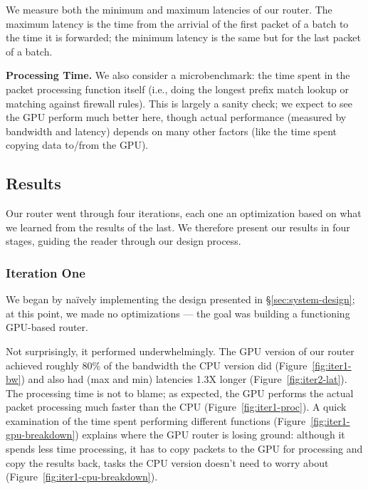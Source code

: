 We measure both the minimum and maximum latencies of our router. The maximum
latency is the time from the arrivial of the first packet of a batch to the
time it is forwarded; the minimum latency is the same but for the last packet
of a batch.

\medskip \noindent \textbf{Processing Time.} We also consider a microbenchmark:
the time spent in the packet processing function itself (i.e., doing the longest
prefix match lookup or matching against firewall rules). This is largely a
sanity check; we expect to see the GPU perform much better here, though actual
performance (measured by bandwidth and latency) depends on many other factors
(like the time spent copying data to/from the GPU).


\subsection{Results}
\label{sec:results}

Our router went through four iterations, each one an optimization based on what
we learned from the results of the last. We therefore present our results in
four stages, guiding the reader through our design process.

\subsubsection{Iteration One}

We began by na\"{i}vely implementing the design presented in
\S\ref{sec:system-design}; at this point, we made no optimizations --- the goal
was building a functioning GPU-based router.

Not surprisingly, it performed underwhelmingly. The GPU version of our router
achieved roughly 80\% of the bandwidth the CPU version did
(Figure~\ref{fig:iter1-bw}) and also had (max and min) latencies 1.3X longer
(Figure~\ref{fig:iter2-lat}). The processing time is not to blame; as expected,
the GPU performs the actual packet processing much faster than the CPU
(Figure~\ref{fig:iter1-proc}). A quick examination of the time spent performing
different functions (Figure~\ref{fig:iter1-gpu-breakdown}) explains where the
GPU router is losing ground: although it spends less time processing, it has to
copy packets to the GPU for processing and copy the results back, tasks the CPU
version doesn't need to worry about (Figure~\ref{fig:iter1-cpu-breakdown}).

